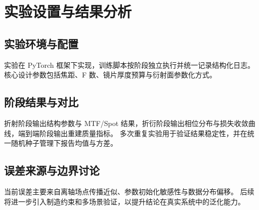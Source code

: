\chapter{实验设置与结果分析}

\section{实验环境与配置}

实验在 PyTorch 框架下实现，训练脚本按阶段独立执行并统一记录结构化日志。
核心设计参数包括焦距、F 数、镜片厚度预算与衍射面参数化方式。

\section{阶段结果与对比}

折射阶段输出结构参数与 MTF/Spot 结果，折衍阶段输出相位分布与损失收敛曲线，端到端阶段输出重建质量指标。
多次重复实验用于验证结果稳定性，并在统一随机种子管理下报告均值与方差。

\section{误差来源与边界讨论}

当前误差主要来自离轴场点传播近似、参数初始化敏感性与数据分布偏移。
后续将进一步引入制造约束和多场景验证，以提升结论在真实系统中的泛化能力。
